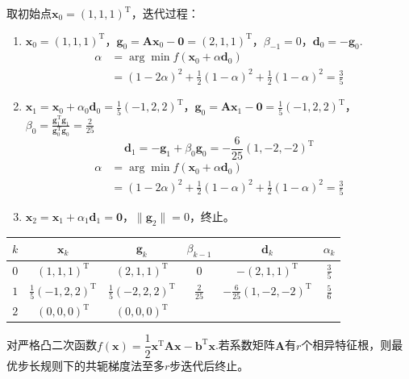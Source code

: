 \begin{example}
    \begin{solution}
        取初始点$\boldsymbol{x}_0 = (1,1,1)^{\mathrm{T}} $，迭代过程：
        \begin{enumerate}
            \item $\boldsymbol{x}_0 = (1,1,1)^{\mathrm{T}} $，$\boldsymbol{g}_0 = \boldsymbol{Ax}_0-\boldsymbol{0} = (2,1,1)^{\mathrm{T}}$，$\beta_{-1} = 0$，$\boldsymbol{d}_{0} = -\boldsymbol{g}_0$.
            \[
                \begin{array}{ll}
                    \alpha &= \arg\min f(\boldsymbol{x}_0+\alpha \boldsymbol{d}_0)\\
                    & = (1-2\alpha)^2+\frac{1}{2}(1-\alpha)^2+\frac{1}{2}(1-\alpha)^2 = \frac{3}{5}
                \end{array}
            \]
            \item $\boldsymbol{x}_1 = \boldsymbol{x}_0+\alpha_0\boldsymbol{d}_0=\frac{1}{5}(-1,2,2)^{\mathrm{T}} $，$\boldsymbol{g}_0 = \boldsymbol{Ax}_1-\boldsymbol{0} = \frac{1}{5}(-1,2,2)^{\mathrm{T}}$，$\beta_{0} = \frac{\boldsymbol{g}_1^{\mathrm{T}}\boldsymbol{g}_1}{\boldsymbol{g}_0^{\mathrm{T}}\boldsymbol{g}_0}= \frac{2}{25}$ 
            \[
                \boldsymbol{d}_{1} = -\boldsymbol{g}_1+\beta_{0}\boldsymbol{g}_0 = -\frac{6}{25}(1,-2,-2)^{\mathrm{T}}
            \]
            \[
                \begin{array}{ll}
                    \alpha &= \arg\min f(\boldsymbol{x}_0+\alpha \boldsymbol{d}_0)\\
                    & = (1-2\alpha)^2+\frac{1}{2}(1-\alpha)^2+\frac{1}{2}(1-\alpha)^2 = \frac{3}{5}
                \end{array}
            \]
            \item $\boldsymbol{x}_2 = \boldsymbol{x}_1 + \alpha_1\boldsymbol{d}_1 = \boldsymbol{0}$，$\|\boldsymbol{g}_2\| = 0$，终止。
        \end{enumerate}

        \begin{table}[htbp]
            \centering
            \begin{tabular}{c|c|c|c|c|c}
                \hline
                $k$ & $\boldsymbol{x}_k$ & $\boldsymbol{g}_k$ & $\beta_{k-1}$ & $\boldsymbol{d}_k$ & $\alpha_k$\\\hline
                $0$ & $ (1,1,1)^{\mathrm{T}} $ & $(2,1,1)^{\mathrm{T}}$ & $0$ & $ -(2,1,1)^{\mathrm{T}} $ & $\frac{3}{5}$\\\hline
                $1$ & $ \frac{1}{5}(-1,2,2)^{\mathrm{T}} $ & $\frac{1}{5}(-2,2,2)^{\mathrm{T}}$ & $\frac{2}{25}$ & $ -\frac{6}{25}(1,-2,-2)^{\mathrm{T}} $ & $\frac{5}{6}$\\\hline
                $2$ & $(0,0,0)^{\mathrm{T}}$ & $(0,0,0)^{\mathrm{T}}$ & \\\hline
            \end{tabular}
        \end{table}
    \end{solution}
\end{example}
\begin{theorem}[收敛速度]
    对严格凸二次函数$f(\boldsymbol{x}) = \dfrac{1}{2}\boldsymbol{x}^{\mathrm{T}}\boldsymbol{Ax}-\boldsymbol{b}^{\mathrm{T}}\boldsymbol{x}$.若系数矩阵$\boldsymbol{A}$有$r$个相异特征根，则最优步长规则下的共轭梯度法至多$r$步迭代后终止。
\end{theorem}
